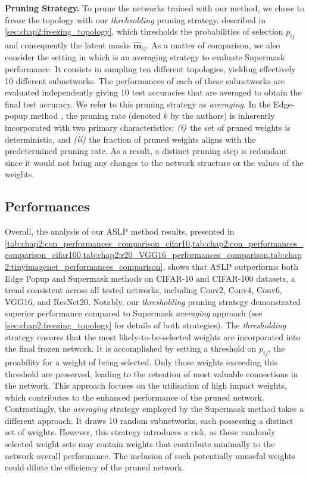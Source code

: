 \noindent\textbf{Pruning Strategy.} To prune the networks trained with our
method, we chose to freeze the topology with our \emph{threhsolding} pruning
strategy, described in \cref{sec:chap2:freezing_topology}, which thresholds the
probabilities of selection $p_{ij}$ and consequently the latent masks
$\bm{\hat{m}}_{ij}$. As a matter of comparison, we also consider the setting in
\cite{DBLP:conf/nips/ZhouLLY19} which is an averaging strategy to evaluate
Supermask performance. It consists in sampling ten different topologies,
yielding effectively 10 different subnetworks. The performances of each of these
subnetworks are evaluated independently giving 10 test accuracies that are
averaged to obtain the final test accuracy. We refer to this pruning strategy as
\textit{averaging}. In the Edge-popup method
\cite{DBLP:conf/cvpr/RamanujanWKFR20}, the pruning rate (denoted $k$ by the
authors) is inherently incorporated with two primary characteristics:
$\emph{(i)}$ the set of pruned weights is deterministic, and $\emph{(ii)}$ the
fraction of pruned weights aligns with the predetermined pruning rate. As a
result, a distinct pruning step is redundant since it would not bring any
changes to the network structure or the values of the weights.\\

\subsection{Performances}
\label{sec:chap2:performances}

Overall, the analysis of our \ac{ASLP} method results, presented in
\cref{tab:chap2:con_performances_comparison_cifar10,tab:chap2:con_performances_comparison_cifar100,tab:chap2:r20_VGG16_performances_comparison,tab:chap2:tinyimagenet_performances_comparison},
shows that \ac{ASLP} outperforms both Edge Popup and Supermask methods on CIFAR-10
and CIFAR-100 datasets, a trend consistent across all tested networks, including
Conv2, Conv4, Conv6, VGG16, and ResNet20. Notably, our \textit{thresholding}
pruning strategy demonstrated superior performance compared to Supermask
\textit{averaging} approach (see \cref{sec:chap2:freezing_topology} for details
of both strategies). The \textit{thresholding} strategy ensures that the most
likely-to-be-selected weights are incorporated into the final frozen network. It
is accomplished by setting a threshold on $p_{ij}$, the proability for a weight
of being selected. Only those weights exceeding this threshold are preserved,
leading to the retention of most valuable connections in the network. This
approach focuses on the utilisation of high impact weights, which contributes to
the enhanced performance of the pruned network. Contrastingly, the
\textit{averaging} strategy employed by the Supermask method
\cite{DBLP:conf/nips/ZhouLLY19} takes a different approach. It draws 10 random
subnetworks, each possessing a distinct set of weights. However, this strategy
introduces a risk, as these randomly selected weight sets may contain weights
that contribute minimally to the network overall performance. The inclusion of
such potentially unuseful weights could dilute the efficiency of the pruned
network.\\

